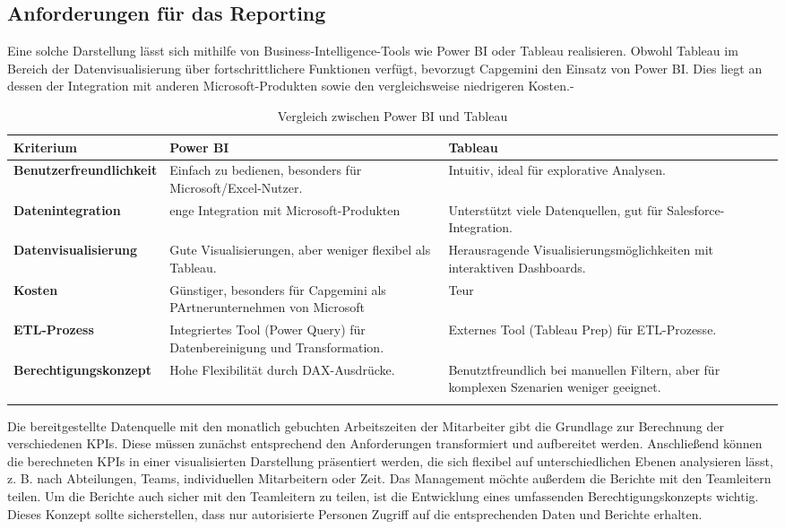 \documentclass[a4paper, 12pt]{scrartcl}
\begin{document}
	\subsection{Anforderungen für das Reporting}
Eine solche Darstellung lässt sich mithilfe von Business-Intelligence-Tools wie Power BI \cite{Power_bi} oder Tableau \cite{Tableua} realisieren. Obwohl Tableau im Bereich der Datenvisualisierung über fortschrittlichere Funktionen verfügt, bevorzugt Capgemini den Einsatz von Power BI. Dies liegt an dessen der Integration mit anderen Microsoft-Produkten sowie den vergleichsweise niedrigeren Kosten.-
	\newline
\begin{longtable}{|p{4.5cm}|p{5.5cm}|p{5.5cm}|}
	\hline
	\textbf{Kriterium} & \textbf{Power BI} & \textbf{Tableau} \\ \hline
	\textbf{Benutzerfreundlichkeit} & Einfach zu bedienen, besonders für Microsoft/Excel-Nutzer. & Intuitiv, ideal für explorative Analysen. \\ \hline
	\textbf{Datenintegration} & enge Integration mit Microsoft-Produkten & Unterstützt viele Datenquellen, gut für Salesforce-Integration. \\ \hline
	\textbf{Datenvisualisierung} & Gute Visualisierungen, aber weniger flexibel als Tableau. & Herausragende Visualisierungsmöglichkeiten mit interaktiven Dashboards. \\ \hline
	\textbf{Kosten} & Günstiger, besonders für Capgemini als PArtnerunternehmen von Microsoft & Teur \\ \hline
	\textbf{ETL-Prozess} & Integriertes Tool (Power Query) für Datenbereinigung und Transformation. & Externes Tool (Tableau Prep) für ETL-Prozesse. \\ \hline
	\textbf{Berechtigungskonzept} & Hohe Flexibilität durch DAX-Ausdrücke. & Benutztfreundlich bei manuellen Filtern, aber für komplexen Szenarien weniger geeignet.\\ \hline
	\caption{Vergleich zwischen Power BI und Tableau}
\end{longtable}
Die bereitgestellte Datenquelle mit den monatlich gebuchten Arbeitszeiten der Mitarbeiter gibt die Grundlage zur Berechnung der verschiedenen KPIs. Diese müssen zunächst entsprechend den Anforderungen transformiert und aufbereitet werden. Anschließend können die berechneten KPIs in einer visualisierten Darstellung präsentiert werden, die sich flexibel auf unterschiedlichen Ebenen analysieren lässt, z. B. nach Abteilungen, Teams, individuellen Mitarbeitern oder Zeit.\newline
Das Management möchte außerdem die Berichte mit den Teamleitern teilen.
Um die Berichte auch sicher mit den Teamleitern zu teilen, ist die Entwicklung eines umfassenden Berechtigungskonzepts wichtig. Dieses Konzept sollte sicherstellen, dass nur autorisierte Personen Zugriff auf die entsprechenden Daten und Berichte erhalten.
\end{document}
